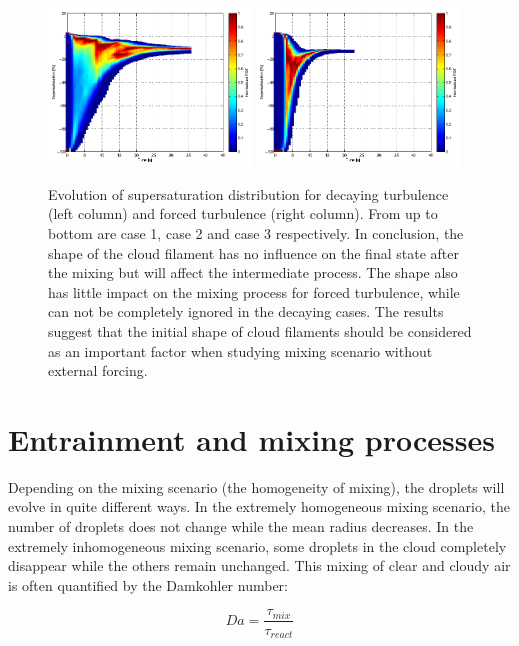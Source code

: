 \documentclass[draft,jgrga]{AGUTeX}
\begin{document}
\begin{article}
\begin{figure}[H]
\includegraphics[width=0.48\textwidth]{Figures/pdf_supersat_d3}
\includegraphics[width=0.48\textwidth]{Figures/pdf_supersat_f3}
\caption{Evolution of supersaturation distribution for decaying turbulence (left column) and forced turbulence (right column). From up to bottom are case 1, case 2 and case 3 respectively. In conclusion, the shape of the cloud filament has no influence on the final state after the mixing but will affect the intermediate process. The shape also has little impact on the mixing process for forced turbulence, while can not be completely ignored in the decaying cases. The results suggest that the initial shape of cloud filaments should be considered as an important factor when studying mixing scenario without external forcing.}\label{fig:supersat_distri}
\end{figure}

\section{Entrainment and mixing processes}
Depending on the mixing scenario (the homogeneity of mixing), the
droplets will evolve in quite different ways. In the extremely homogeneous mixing scenario, the number of droplets does not change while the mean radius decreases. In the extremely inhomogeneous mixing scenario, some droplets in the cloud completely disappear while the others remain unchanged. This mixing of clear and cloudy air is often quantified by the Damkohler number:

\begin{equation}
Da=\frac{\tau_{mix}}{\tau_{react}}\label{eq:DaNumber}
\end{equation}



\end{article}
\end{document}
